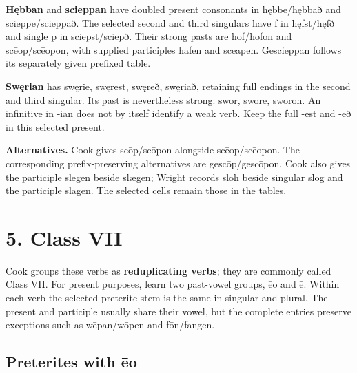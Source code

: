 \textbf{Hębban} and \textbf{scieppan} have doubled present consonants in hębbe/\allowbreak{}hębbað and scieppe/\allowbreak{}scieppað. The selected second and third singulars have f in hęfst/\allowbreak{}hęfð and single p in sciepst/\allowbreak{}sciepð. Their strong pasts are hōf/\allowbreak{}hōfon and scēop/\allowbreak{}scēopon, with supplied participles hafen and sceapen. Gescieppan follows its separately given prefixed table.

\textbf{Swęrian} has swęrie, swęrest, swęreð, swęriað, retaining full endings in the second and third singular. Its past is nevertheless strong: swōr, swōre, swōron. An infinitive in -ian does not by itself identify a weak verb. Keep the full -est and -eð in this selected present.

\textbf{Alternatives.} Cook gives scōp/\allowbreak{}scōpon alongside scēop/\allowbreak{}scēopon. The corresponding prefix-preserving alternatives are gescōp/\allowbreak{}gescōpon. Cook also gives the participle slegen beside slægen; Wright records slōh beside singular slōg and the participle slagen. The selected cells remain those in the tables.

\section*{5. Class VII}

Cook groups these verbs as \textbf{reduplicating verbs}; they are commonly called Class VII. For present purposes, learn two past-vowel groups, ēo and ē. Within each verb the selected preterite stem is the same in singular and plural. The present and participle usually share their vowel, but the complete entries preserve exceptions such as wēpan/\allowbreak{}wōpen and fōn/\allowbreak{}fangen.

\subsection*{Preterites with ēo}

